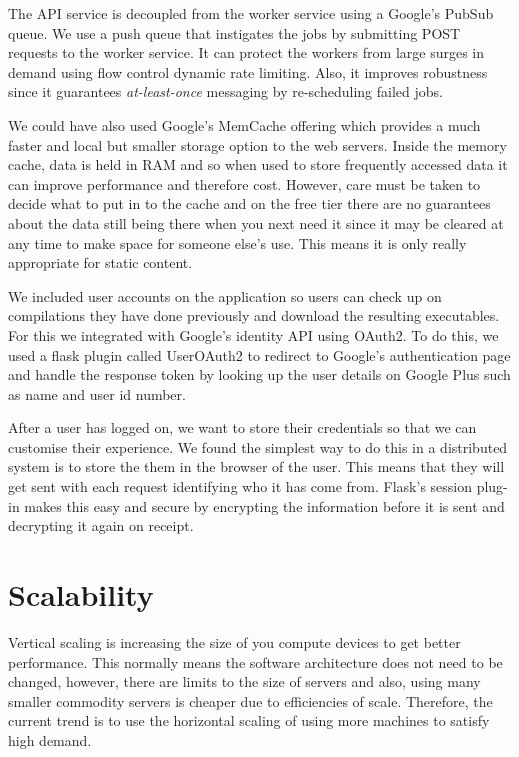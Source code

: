 \documentclass[conference]{IEEEtran}
\begin{document}
The API service is decoupled from the worker service using a Google's PubSub
queue\cite{pubsub}. We use a push queue that instigates the jobs by submitting
POST requests to the worker service. It can protect the workers from large
surges in demand using flow control dynamic rate limiting. Also, it improves
robustness since it guarantees \emph{at-least-once} messaging by re-scheduling
failed jobs.

We could have also used Google's MemCache\cite{mem} offering which provides a
much faster and local but smaller storage option to the web servers. Inside the
memory cache, data is held in RAM and so when used to store frequently accessed
data it can improve performance and therefore cost. However, care must be taken
to decide what to put in to the cache and on the free tier there are no
guarantees about the data still being there when you next need it since it may
be cleared at any time to make space for someone else's use. This means it is
only really appropriate for static content.

We included user accounts on the application so users can check up on
compilations they have done previously and download the resulting executables.
For this we integrated with Google's identity API using OAuth2. To do this, we
used a flask plugin called UserOAuth2\cite{oauth} to redirect to Google's
authentication page and handle the response token by looking up the user
details on Google Plus such as name and user id number.

After a user has logged on, we want to store their credentials so that we can
customise their experience. We found the simplest way to do this in a
distributed system is to store the them in the browser of the user. This means
that they will get sent with each request identifying who it has come from.
Flask's session plug-in makes this easy and secure by encrypting the
information before it is sent and decrypting it again on receipt.

\section{Scalability}

Vertical scaling is increasing the size of you compute devices to get better
performance. This normally means the software architecture does not need to be
changed, however, there are limits to the size of servers and also, using many
smaller commodity servers is cheaper due to efficiencies of scale. Therefore,
the current trend is to use the horizontal scaling of using more machines to
satisfy high demand.
\end{document}
